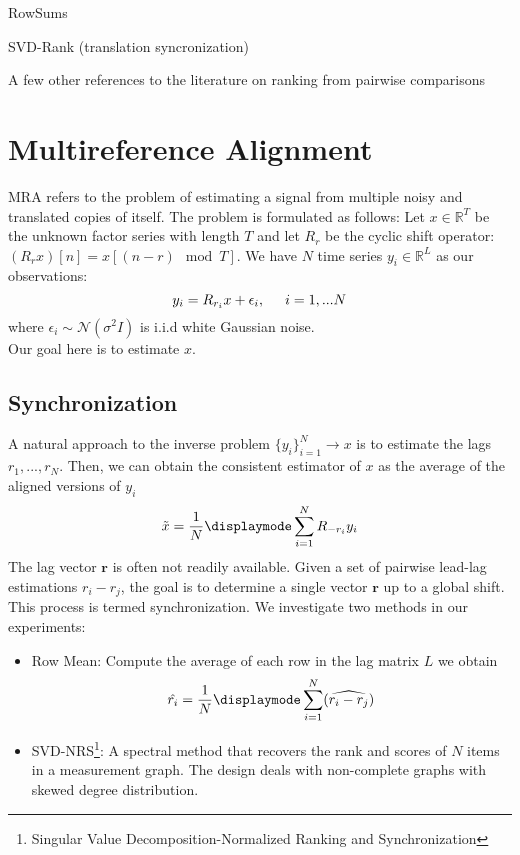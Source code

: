 \documentclass[sigconf]{acmart}
\begin{document}
RowSums

SVD-Rank (translation syncronization)

A few other references to the literature on ranking from pairwise comparisons 




\section{Multireference Alignment}
MRA refers to the problem of estimating a signal from multiple noisy and translated copies of itself. The problem is formulated as follows:
Let $x \in \mathbb{R}^T$ be the unknown factor series with length $T$ and let $R_r$ be the cyclic shift operator: $(R_rx)[n] = x[(n-r) \mod T]$. We have $N$ time series $y_i \in \mathbb{R}^L$ as our observations:
$$y_i = R_{r_i}x + \epsilon_i, \hspace{.5cm} i = 1,...N$$
where $\epsilon_i \sim \mathcal{N}(\sigma^2I)$ is i.i.d white Gaussian noise.\\
Our goal here is to estimate $x$.
\subsection{Synchronization}
\label{sec:sync}
A natural approach to the inverse problem $\{y_i\}_{i=1}^N \rightarrow x$ is to estimate the lags $r_1,...,r_N$. Then, we can obtain the consistent estimator of $x$ as the average of the aligned versions of $y_i$
$$\Tilde{x} = \frac{1}{N}\displaymode\sum_{i=1}^N R_{-r_i}y_i$$
The lag vector $\mathbf{r}$ is often not readily available. Given a set of pairwise lead-lag estimations $r_i-r_j$, the goal is to determine a single vector $\mathbf{r}$ up to a global shift. This process is termed synchronization. We investigate two methods in our experiments:
\begin{itemize}
\item Row Mean: Compute the average of each row in the lag matrix $L$ we obtain 
$$\hat{r_i} = \frac{1}{N}\displaymode\sum_{i=1}^N (\widehat{r_i-r_j}) $$
\item SVD-NRS\footnote{Singular Value Decomposition-Normalized Ranking and Synchronization}: A spectral method that recovers the rank and scores of $N$ items in a measurement graph. The design deals with non-complete graphs with skewed degree distribution\cite{synchronization_SVD}.

\end{itemize}
\end{document}
